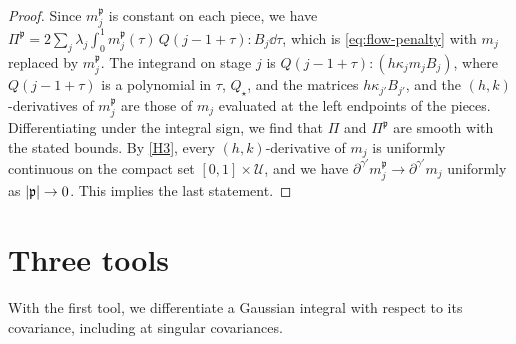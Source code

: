 \begin{proof}
Since $m_j^{\mathfrak p}$ is constant on each piece, we have
$\Pi^{\mathfrak p}=2\sum_j\lambda_j\int_0^1m_j^{\mathfrak p}(\tau)\,Q(j-1+\tau)\mathbin{:}B_j\dd\tau$,
which is \eqref{eq:flow-penalty} with $m_j$ replaced by $m_j^{\mathfrak p}$. The
integrand on stage $j$ is $Q(j-1+\tau)\mathbin{:}(h\kappa_jm_jB_j)$, where
$Q(j-1+\tau)$ is a polynomial in $\tau$, $Q_\star$, and the matrices
$h\kappa_{j'}B_{j'}$, and the $(h,k)$-derivatives of $m_j^{\mathfrak p}$ are those
of $m_j$ evaluated at the left endpoints of the pieces. Differentiating under the integral sign, we
find that $\Pi$ and $\Pi^{\mathfrak p}$ are smooth with the stated bounds. By
\ref{H3}, every $(h,k)$-derivative of $m_j$ is uniformly continuous on the
compact set $[0,1]\times\mathcal U$, and we have
$\partial^{\gamma'}m_j^{\mathfrak p}\to\partial^{\gamma'}m_j$ uniformly as
$\lvert \mathfrak p\rvert\to0$. This implies the last statement.
\end{proof}

\section{Three tools}\label{sec:flow-tools}

With the first tool, we differentiate a Gaussian integral with respect to its
covariance, including at singular covariances.

